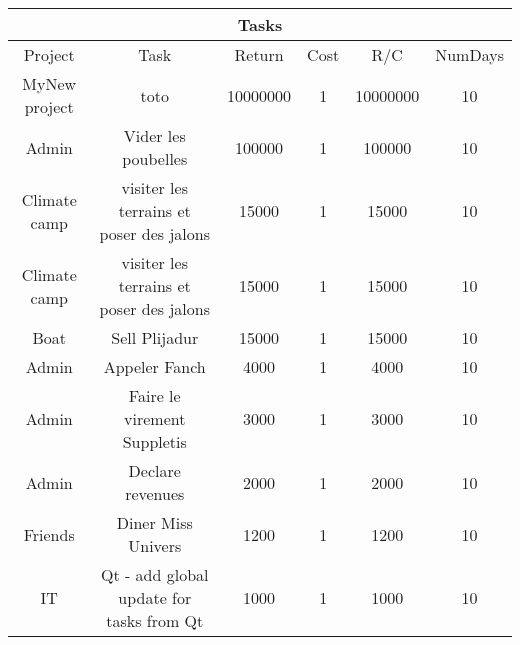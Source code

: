 \begin{longtable}{|c|c|c|c|c|c|}
\hline
\multicolumn{6}{|c|}{Tasks} \\
\hline
Project & Task & Return & Cost & R/C & NumDays \\
\hline
MyNew project & toto & 10000000 & 1 & 10000000 & 10\\
\hline
Admin & Vider les poubelles & 100000 & 1 & 100000 & 10\\
\hline
Climate camp & visiter les terrains et poser des jalons & 15000 & 1 & 15000 & 10\\
\hline
Climate camp & visiter les terrains et poser des jalons & 15000 & 1 & 15000 & 10\\
\hline
Boat & Sell Plijadur & 15000 & 1 & 15000 & 10\\
\hline
Admin & Appeler Fanch & 4000 & 1 & 4000 & 10\\
\hline
Admin & Faire le virement Suppletis & 3000 & 1 & 3000 & 10\\
\hline
Admin & Declare revenues & 2000 & 1 & 2000 & 10\\
\hline
Friends & Diner Miss Univers & 1200 & 1 & 1200 & 10\\
\hline
IT & Qt - add global update for tasks from Qt & 1000 & 1 & 1000 & 10\\
\hline
\end{longtable}
